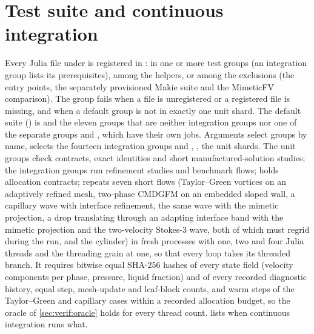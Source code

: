 \section{Test suite and continuous integration}\label{sec:verif:suite}
Every Julia file under  is registered in :
in one or more test groups (an integration group lists its prerequisites),
among the helpers, or among the exclusions (the entry points, the separately
provisioned Makie suite and the MimeticFV comparison). The group
 fails when a file is unregistered or a registered file is
missing, and when a default group is not in exactly one unit shard. The
default suite () is  and the eleven groups
that are neither integration groups nor one of the separate groups
 and , which have their own
jobs. Arguments select groups by name,  selects the fourteen
integration groups and , ,  the unit
shards. The unit groups check contracts, exact identities and short
manufactured-solution studies; the integration groups run refinement studies
and benchmark flows;  holds allocation contracts;
 repeats seven short flows (Taylor--Green vortices on
an adaptively refined mesh, two-phase CMDGFM on an embedded sloped wall, a
capillary wave with interface refinement, the same wave with the mimetic
projection, a drop translating through an adapting interface band with the
mimetic projection and the two-velocity Stokes-3 wave, both of which must
regrid during the run, and the cylinder) in fresh processes with one, two
and four Julia threads and the threading grain at one, so that every loop
takes its threaded branch. It requires bitwise equal SHA-256 hashes of every
state field (velocity components per phase, pressure, liquid fraction) and of
every recorded diagnostic history, equal step, mesh-update and leaf-block
counts, and warm steps of the Taylor--Green and capillary cases within a
recorded allocation budget, so the oracle of \cref{sec:verif:oracle} holds for
every thread count.
 lists when continuous integration runs what.

